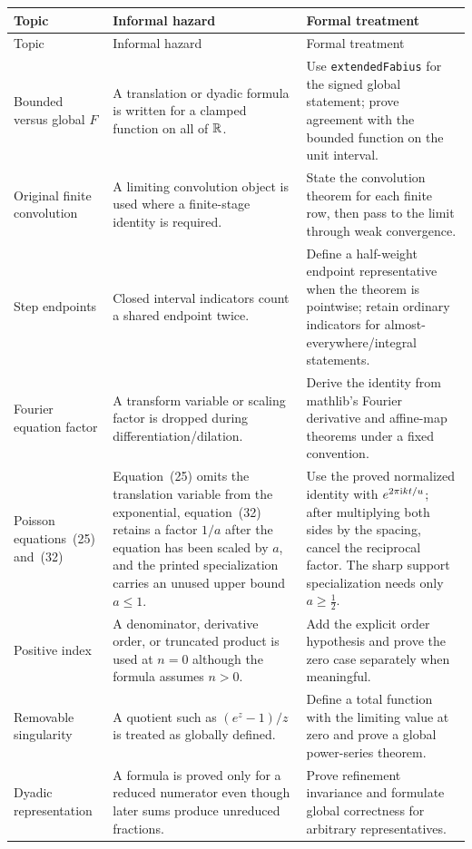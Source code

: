 \documentclass[11pt,oneside]{article}
\theoremstyle{definition}
\theoremstyle{remark}
\begin{document}
\begin{longtable}{@{}>{\raggedright\arraybackslash}p{} >{\raggedright\arraybackslash}p{} >{\raggedright\arraybackslash}p{}@{}}
\toprule
Topic & Informal hazard & Formal treatment \\
\midrule
\endfirsthead
\toprule
Topic & Informal hazard & Formal treatment \\
\midrule
\endhead
Bounded versus global \(F\) & A translation or dyadic formula is written for a clamped function on all of \(\mathbb{R}\). & Use \nolinkurl{extendedFabius} for the signed global statement; prove agreement with the bounded function on the unit interval. \\
Original finite convolution & A limiting convolution object is used where a finite-stage identity is required. & State the convolution theorem for each finite row, then pass to the limit through weak convergence. \\
Step endpoints & Closed interval indicators count a shared endpoint twice. & Define a half-weight endpoint representative when the theorem is pointwise; retain ordinary indicators for almost-everywhere/integral statements. \\
Fourier equation factor & A transform variable or scaling factor is dropped during differentiation/dilation. & Derive the identity from mathlib's Fourier derivative and affine-map theorems under a fixed convention. \\
Poisson equations~(25) and~(32) & Equation~(25) omits the translation variable from the exponential, equation~(32) retains a factor \(1/a\) after the equation has been scaled by \(a\), and the printed specialization carries an unused upper bound \(a\leq1\). & Use the proved normalized identity with \(e^{2\pi\mathrm{i} kt/u}\); after multiplying both sides by the spacing, cancel the reciprocal factor.  The sharp support specialization needs only \(a\geq\tfrac12\). \\
Positive index & A denominator, derivative order, or truncated product is used at \(n=0\) although the formula assumes \(n>0\). & Add the explicit order hypothesis and prove the zero case separately when meaningful. \\
Removable singularity & A quotient such as \((e^z-1)/z\) is treated as globally defined. & Define a total function with the limiting value at zero and prove a global power-series theorem. \\
Dyadic representation & A formula is proved only for a reduced numerator even though later sums produce unreduced fractions. & Prove refinement invariance and formulate global correctness for arbitrary representatives. \\

\end{longtable}
\end{document}
